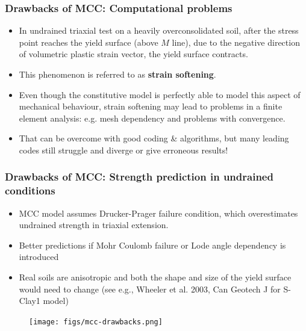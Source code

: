 \documentclass[notes]{beamer}
\begin{document}
\begin{frame}
\frametitle{Drawbacks of MCC: Computational problems}
\begin{itemize}
	\item In undrained triaxial test on a heavily overconsolidated soil, after the stress point reaches the yield surface (above $M$ line), due to the negative direction of volumetric plastic strain vector, the yield surface contracts.
	
	\item This phenomenon is referred to as \textbf{strain softening}.

	\item Even though the constitutive model is perfectly able to model this
	aspect of mechanical behaviour, strain softening may lead to problems in a finite element analysis: e.g. mesh dependency and problems with convergence.
	
	\item That can be overcome with good coding \& algorithms, but many leading codes still struggle and diverge or give erroneous results!
	
\end{itemize}
\end{frame}

\begin{frame}
\frametitle{Drawbacks of MCC: Strength prediction in undrained conditions}
\noindent
\fboxsep=0pt
\noindent
\begin{minipage}[t]{0.65\linewidth}
	\begin{itemize}
		\item MCC model assumes Drucker-Prager failure
		condition, which overestimates undrained 	strength in triaxial extension. 
		\item Better predictions if Mohr Coulomb failure or Lode angle dependency is introduced
		\item Real soils are anisotropic and both the shape and size of the yield surface would need to change (see e.g., Wheeler et al. 2003, Can Geotech J for S-Clay1 model)
	\end{itemize}
	
\end{minipage}%
\hfill
\begin{minipage}[t]{0.35\linewidth}
	\begin{figure}
		\texttt{[image: figs/mcc-drawbacks.png]}
	\end{figure}
\end{minipage}	
\end{frame}
\end{document}

